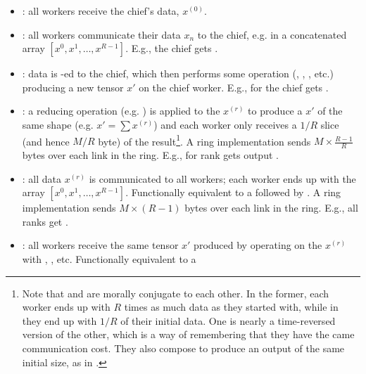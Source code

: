 \documentclass[11pt]{article}
\begin{document}
\begin{itemize}
	\item {}: all workers receive  the chief's data, $ x ^{ (0) }  $.
	\item {}: all workers communicate their data $ x _{ n } $ to the chief, e.g. in a
	      concatenated array $ [x ^{ 0 }, x ^{ 1 }, \ldots , x ^{ R-1 }] $. E.g., the chief gets
          .
	\item {}: data is -ed to the chief, which then performs some
	      operation (, , , etc.) producing a new tensor $
		      x' $ on the chief worker. E.g., for  the chief gets
              .
    \item {}: a reducing operation (e.g. ) is applied to the $ x
        ^{ (r) } $ to produce a $ x' $ of the same shape (e.g. $ x'= \sum x ^{ (r) } $) and each
        worker only receives a $ 1/R $ slice (and hence $ M/R $ byte) of the result\footnote{Note that 
            and  are morally conjugate to each other. In the former, each
            worker ends up with $ R $ times as much data as they started with, while in
         they end up with $ 1/R $ of their initial data. One is nearly a
        time-reversed version of the other, which is a way of remembering that they have the came
        communication cost. They also compose to produce an output of the same initial size, as in
        .}. A ring implementation sends $ M \times \frac{ R-1 }{ R } $ bytes
        over each link in the ring. E.g., for  rank  gets output
        .
    \item {}: all data $ x ^{ (r) } $ is communicated to all workers; each worker
        ends up with the array $ [x ^{ 0 }, x ^{ 1 }, \ldots , x ^{ R-1 }] $. Functionally
        equivalent to a  followed by . A ring implementation
        sends $ M \times \left ( R-1 \right ) $ bytes over each link in the ring. E.g., all ranks
        get .
	\item {}: all workers receive the same tensor $ x' $ produced by operating on
	      the $ x ^{ (r) } $ with , , etc. Functionally equivalent to a

\end{itemize}
\end{document}
